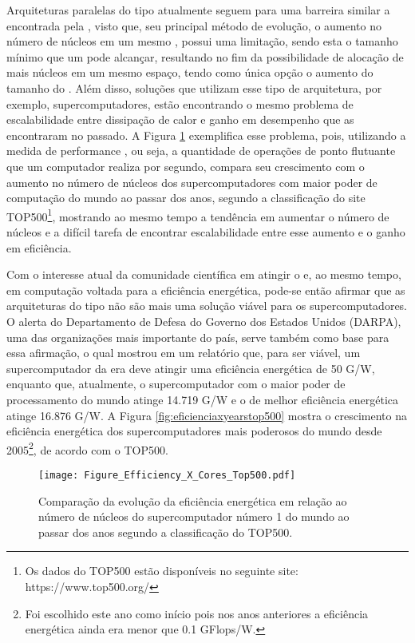 Arquiteturas paralelas do tipo \multicore atualmente seguem para uma barreira similar a encontrada pela \singlecore, visto que, seu principal método de evolução, o aumento no número de núcleos em um mesmo \chip, possui uma limitação, sendo esta o tamanho mínimo que um \transistor pode alcançar, resultando no fim da possibilidade de alocação de mais núcleos em um mesmo espaço, tendo como única opção o aumento do tamanho do \chip. Além disso, soluções que utilizam esse tipo de arquitetura, por exemplo, supercomputadores, estão encontrando o mesmo problema de escalabilidade entre dissipação de calor e ganho em desempenho que as \singlecore encontraram no passado. A Figura \ref{fig:eficienciaxcorestop500} exemplifica esse problema, pois, utilizando a medida de performance \textit{\Flops}, ou seja, a quantidade de operações de ponto flutuante que um computador realiza por segundo, compara seu crescimento com o aumento no número de núcleos dos supercomputadores com maior poder de computação do mundo ao passar dos anos, segundo a classificação do site TOP500\footnote{Os dados do TOP500 estão disponíveis no seguinte site: https://www.top500.org/}, mostrando ao mesmo tempo a tendência em aumentar o número de núcleos e a difícil tarefa de encontrar escalabilidade entre esse aumento e o ganho em eficiência.

Com o interesse atual da comunidade científica em atingir o \exascale e, ao mesmo tempo, em computação voltada para a eficiência energética, pode-se então afirmar que as arquiteturas do tipo \multicore não são mais uma solução viável para os supercomputadores. O alerta do Departamento de Defesa do Governo dos Estados Unidos (DARPA), uma das organizações mais importante do país, serve também como base para essa afirmação, o qual mostrou em um relatório \cite{darpa:exascale} que, para ser viável, um supercomputador da era  \exascale deve atingir uma eficiência energética de 50 G\Flops/W, enquanto que, atualmente, o supercomputador com o maior poder de processamento do mundo atinge 14.719 G\Flops/W e o de melhor eficiência energética atinge 16.876 G\Flops/W. A Figura \ref{fig:eficienciaxyearstop500} mostra o crescimento na eficiência energética dos supercomputadores mais poderosos do mundo desde 2005\footnote{Foi escolhido este ano como início pois nos anos anteriores a eficiência energética ainda era menor que 0.1 GFlops/W.}, de acordo com o TOP500.

\begin{figure}[tb]
  \centering
  \caption{Comparação da evolução da eficiência energética em relação ao número de núcleos do supercomputador número 1 do mundo ao passar dos anos segundo a classificação do TOP500.}
  \label{fig:eficienciaxcorestop500}
  \texttt{[image: Figure\_Efficiency\_X\_Cores\_Top500.pdf]}
\end{figure}

